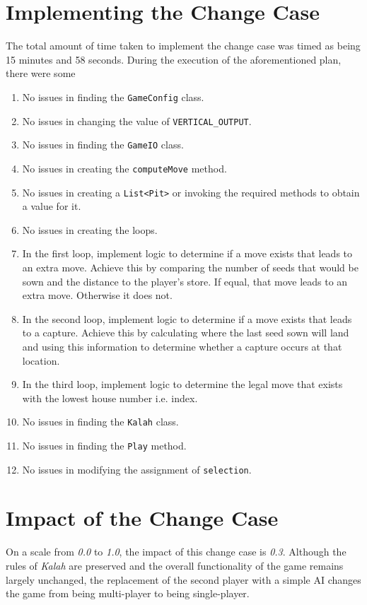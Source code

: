 \documentclass[10pt, a4paper, conference]{IEEEtran}
\begin{document}
\section{Implementing the Change Case}
The total amount of time taken to implement the change case was timed as being 
15 minutes and 58 seconds. During the execution of the aforementioned plan, there were some
\begin{enumerate}
  \item No issues in finding the \texttt{GameConfig} class.
  \item No issues in changing the value of \texttt{VERTICAL\_OUTPUT}.
  \item No issues in finding the \texttt{GameIO} class.
  \item No issues in creating the \texttt{computeMove} method.
  \item No issues in creating a \texttt{List<Pit>} or invoking the required
    methods to obtain a value for it.
  \item No issues in creating the loops.
  \item In the first loop, implement logic to determine if a move exists that
    leads to an extra move. Achieve this by comparing the number of seeds that
    would be sown and the distance to the player's store. If equal, that move
    leads to an extra move. Otherwise it does not.
  \item In the second loop, implement logic to determine if a move exists that
    leads to a capture. Achieve this by calculating where the last seed sown
    will land and using this information to determine whether a capture occurs
    at that location.
  \item In the third loop, implement logic to determine the legal move that
    exists with the lowest house number i.e. index.
  \item No issues in finding the \texttt{Kalah} class.
  \item No issues in finding the \texttt{Play} method.
  \item No issues in modifying the assignment of \texttt{selection}.
\end{enumerate}

\section{Impact of the Change Case}
On a scale from \textit{0.0} to \textit{1.0}, the impact of this change case is
\textit{0.3}. Although the rules of \textit{Kalah} are preserved and the
overall functionality of the game remains largely unchanged, the replacement 
of the second player with a simple AI changes the game from being multi-player 
to being single-player.
\end{document}
